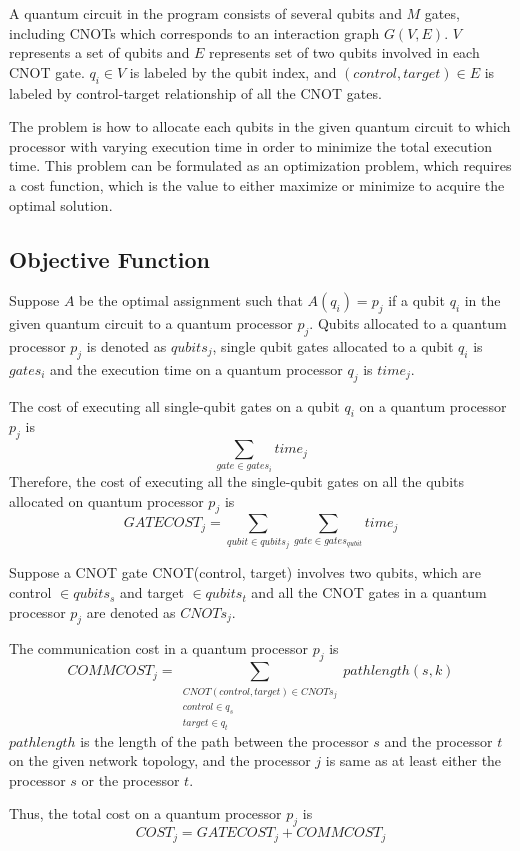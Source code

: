 A quantum circuit in the program consists of several qubits and $M$ gates, including CNOTs which corresponds to an interaction graph $G(V, E)$. $V$ represents a set of qubits and $E$ represents set of two qubits involved in each CNOT gate.  $q_i \in V$ is labeled by the qubit index, and $(control, target) \in E$ is labeled by control-target relationship of all the CNOT gates.

The problem is how to allocate each qubits in the given quantum circuit to which processor with varying execution time in order to minimize the total execution time. This problem can be formulated as an optimization problem, which requires a cost function, which is the value to either maximize or minimize to acquire the optimal solution.

\newpage
\subsection{Objective Function}

Suppose $A$ be the optimal assignment such that $A(q_i) = p_j$ if a qubit $q_i$ in the given quantum circuit to a quantum processor $p_j$. Qubits allocated to a quantum processor $p_j$ is denoted as $qubits_j$, single qubit gates allocated to a qubit $q_i$ is $gates_i$ and the execution time on a quantum processor $q_j$ is $time_j$.

The cost of executing all single-qubit gates on a qubit $q_i$ on a quantum processor $p_j$ is 
$$\sum_{gate \in gates_i} time_j$$
Therefore, the cost of executing all the single-qubit gates on all the qubits allocated on quantum processor $p_j$ is 
$$GATECOST_j = \sum_{qubit \in qubits_j} \sum_{gate \in gates_{qubit}} time_j$$

Suppose a CNOT gate CNOT(control, target) involves two qubits, which are control $\in qubits_s$ and target $\in qubits_t$ and all the CNOT gates in a quantum processor $p_j$ are denoted as $CNOTs_{j}$.

The communication cost in a quantum processor $p_j$ is 
$$COMMCOST_j = \sum_{ \substack{CNOT (control, target) \in CNOTs_{j} \\ control \in q_s \\ target \in q_t}} pathlength(s, k)$$
$pathlength$ is the length of the path between the processor $s$ and the processor $t$ on the given network topology, and the processor $j$ is same as at least either the processor $s$ or the processor $t$.

Thus, the total cost on a quantum processor $p_j$ is 
$$COST_j = GATECOST_j + COMMCOST_j$$

